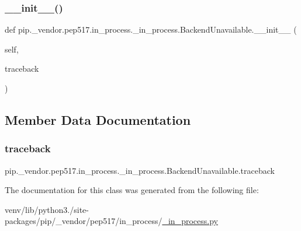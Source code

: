 \subsubsection{\texorpdfstring{\+\_\+\+\_\+init\+\_\+\+\_\+()}{\_\_init\_\_()}}
{\footnotesize\ttfamily def pip.\+\_\+vendor.\+pep517.\+in\+\_\+process.\+\_\+in\+\_\+process.\+Backend\+Unavailable.\+\_\+\+\_\+init\+\_\+\+\_\+ (\begin{DoxyParamCaption}\item[{}]{self,  }\item[{}]{traceback }\end{DoxyParamCaption})}



\subsection{Member Data Documentation}
\mbox{\label{classpip_1_1__vendor_1_1pep517_1_1in__process_1_1__in__process_1_1BackendUnavailable_ab93589fe53d537103120cea87a6feebb}} 
\subsubsection{\texorpdfstring{traceback}{traceback}}
{\footnotesize\ttfamily pip.\+\_\+vendor.\+pep517.\+in\+\_\+process.\+\_\+in\+\_\+process.\+Backend\+Unavailable.\+traceback}



The documentation for this class was generated from the following file\+:\begin{DoxyCompactItemize}
\item 
venv/lib/python3./site-\/packages/pip/\+\_\+vendor/pep517/in\+\_\+process/\hyperlink{__in__process_8py}{\+\_\+in\+\_\+process.\+py}\end{DoxyCompactItemize}
